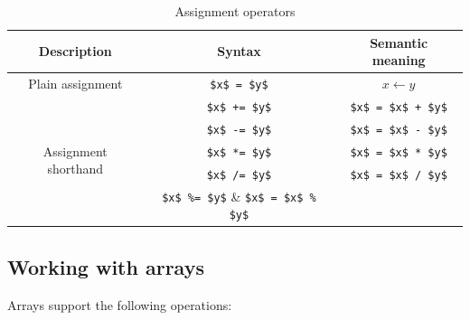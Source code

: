 \documentclass[UdineBachThesis,american,11pt]{PhdThesis}
\begin{document}
  \begin{table}[h]
    \centering

    \begin{tabular}{|c|c|c|}
      \hline

      Description &
      Syntax &
      Semantic meaning \\
      \hline

      Plain assignment &
      \lstinline[mathescape]@$x$ = $y$@ &
      $x \leftarrow y$ \\

      \multirow{5}{*}{Assignment shorthand} &
      \lstinline[mathescape]@$x$ += $y$@ &
      \lstinline[mathescape]@$x$ = $x$ + $y$@ \\

      &
      \lstinline[mathescape]@$x$ -= $y$@ &
      \lstinline[mathescape]@$x$ = $x$ - $y$@ \\

      &
      \lstinline[mathescape]@$x$ *= $y$@ &
      \lstinline[mathescape]@$x$ = $x$ * $y$@ \\

      &
      \lstinline[mathescape]@$x$ /= $y$@ &
      \lstinline[mathescape]@$x$ = $x$ / $y$@ \\

      &
      \lstinline[mathescape]@$x$ %= $y$@ &
      \lstinline[mathescape]@$x$ = $x$ % $y$@ \\
      \hline
    \end{tabular}

    \caption{Assignment operators}
    \label{table:assignment-operators}
  \end{table}

  \subsection{Working with arrays}

  Arrays support the following operations:
\end{document}
